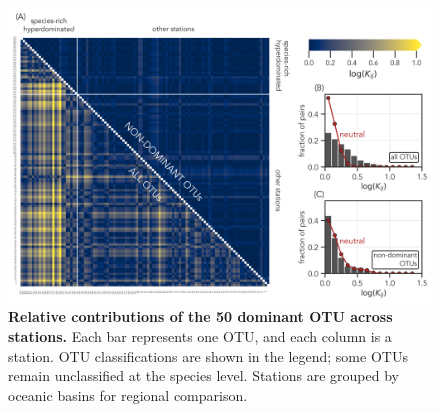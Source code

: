 \documentclass[%
 preprint,            %
 superscriptaddress, %
 amsmath,amssymb,    %
 aps,                %
 pra,                %
 floatfix,           %
]{revtex4-2}
\begin{document}
\begin{figure}
    \centering
    \includegraphics[width=0.95\linewidth]{fig/Hyperdominated_K_log_distance.png}
    \caption{\textbf{Relative contributions of the 50 dominant OTU across stations.} Each bar represents one OTU, and each column is a station. OTU classifications are shown in the legend; some OTUs remain unclassified at the species level. Stations are grouped by oceanic basins for regional comparison.}
    \label{fig:placeholder}
\end{figure}
\end{document}
